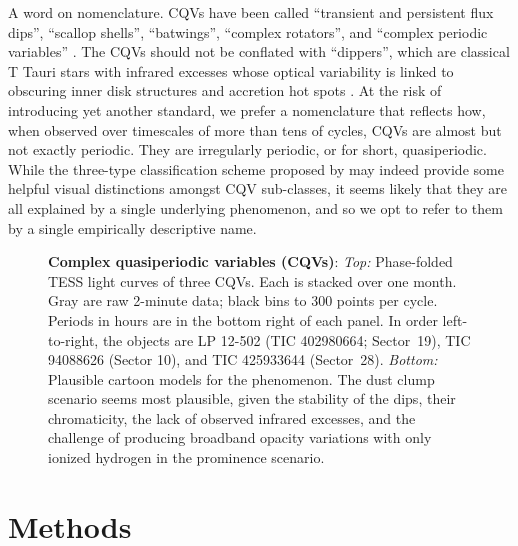 \documentclass[11pt,twocolumn,tighten]{aastex63}
\begin{document}
A word on nomenclature.  CQVs have been called ``transient and
persistent flux dips'', ``scallop shells'', ``batwings'',
\citep{2017AJ....153..152S} ``complex rotators'',
\citep{2019ApJ...876..127Z,2022AJ....163..144G,2023ApJ...945..114P}
and ``complex periodic variables'' \citep{2023MNRAS.518.2921K}.  The
CQVs should not be conflated with ``dippers'', which are classical T
Tauri stars with infrared excesses whose optical variability is linked
to obscuring inner disk structures and accretion hot spots
\citep{2014AJ....147...82C,2021ApJ...908...16R}.  At the risk of
introducing yet another standard, we prefer a nomenclature that
reflects how, when observed over timescales of more than tens of
cycles, CQVs are almost but not exactly periodic.  They are
irregularly periodic, or for short, quasiperiodic.  While the
three-type classification scheme proposed by
\citet{2017AJ....153..152S} may indeed provide some helpful visual
distinctions amongst CQV sub-classes, it seems likely that they are
all explained by a single underlying phenomenon, and so we opt to
refer to them by a single empirically descriptive name.


\begin{figure*}[!t]
	\begin{center}
		
		\vspace{-0.6cm}
	\end{center}
		\vspace{-0.3cm}
	\caption{
		{\bf Complex quasiperiodic variables (CQVs)}:
		{\it Top:} Phase-folded TESS light curves of three CQVs.  Each is
		stacked over one month.  Gray are raw 2-minute data; black bins to
		300 points per cycle.  Periods in hours are in the bottom right of
		each panel.  In order left-to-right, the objects are LP 12-502
		(TIC 402980664; Sector~19), TIC 94088626 (Sector 10), and TIC
		425933644 (Sector~28).
		{\it Bottom:} Plausible cartoon models for the phenomenon.  The
		dust clump scenario seems most plausible, given
    the stability of the dips, their chromaticity, the lack of
    observed infrared excesses, and the challenge of producing
    broadband opacity variations with only ionized hydrogen in the
    prominence scenario.
	}
	\label{fig:f1}
\end{figure*}



\section{Methods}
\label{sec:methods}
\end{document}
